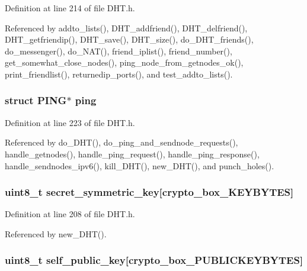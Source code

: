 Definition at line 214 of file D\+H\+T.\+h.



Referenced by addto\+\_\+lists(), D\+H\+T\+\_\+addfriend(), D\+H\+T\+\_\+delfriend(), D\+H\+T\+\_\+getfriendip(), D\+H\+T\+\_\+save(), D\+H\+T\+\_\+size(), do\+\_\+\+D\+H\+T\+\_\+friends(), do\+\_\+messenger(), do\+\_\+\+N\+A\+T(), friend\+\_\+iplist(), friend\+\_\+number(), get\+\_\+somewhat\+\_\+close\+\_\+nodes(), ping\+\_\+node\+\_\+from\+\_\+getnodes\+\_\+ok(), print\+\_\+friendlist(), returnedip\+\_\+ports(), and test\+\_\+addto\+\_\+lists().

\hypertarget{struct_d_h_t_ae3f68e3d55e46726b05717fc88198321}{
\subsubsection[{ping}]{\setlength{\rightskip}{0pt plus 5cm}struct {\bf P\+I\+N\+G}$\ast$ ping}}\label{struct_d_h_t_ae3f68e3d55e46726b05717fc88198321}


Definition at line 223 of file D\+H\+T.\+h.



Referenced by do\+\_\+\+D\+H\+T(), do\+\_\+ping\+\_\+and\+\_\+sendnode\+\_\+requests(), handle\+\_\+getnodes(), handle\+\_\+ping\+\_\+request(), handle\+\_\+ping\+\_\+response(), handle\+\_\+sendnodes\+\_\+ipv6(), kill\+\_\+\+D\+H\+T(), new\+\_\+\+D\+H\+T(), and punch\+\_\+holes().

\hypertarget{struct_d_h_t_ab9f2ff47bc0b1e5110202a6e4be86390}{
\subsubsection[{secret\+\_\+symmetric\+\_\+key}]{\setlength{\rightskip}{0pt plus 5cm}uint8\+\_\+t secret\+\_\+symmetric\+\_\+key\mbox{[}{\bf crypto\+\_\+box\+\_\+\+K\+E\+Y\+B\+Y\+T\+E\+S}\mbox{]}}}\label{struct_d_h_t_ab9f2ff47bc0b1e5110202a6e4be86390}


Definition at line 208 of file D\+H\+T.\+h.



Referenced by new\+\_\+\+D\+H\+T().

\hypertarget{struct_d_h_t_ae726df8bdc26380e5a6c3187a00d6881}{
\subsubsection[{self\+\_\+public\+\_\+key}]{\setlength{\rightskip}{0pt plus 5cm}uint8\+\_\+t self\+\_\+public\+\_\+key\mbox{[}crypto\+\_\+box\+\_\+\+P\+U\+B\+L\+I\+C\+K\+E\+Y\+B\+Y\+T\+E\+S\mbox{]}}}\label{struct_d_h_t_ae726df8bdc26380e5a6c3187a00d6881}



